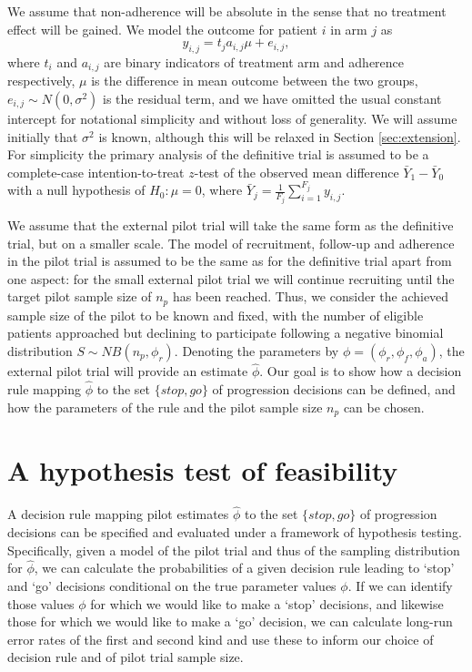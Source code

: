 \documentclass{article}
\begin{document}
We assume that non-adherence will be absolute in the sense that no treatment effect will be gained. We model the outcome for patient $i$ in arm $j$ as
$$
y_{i,j} = t_j a_{i,j} \mu + e_{i,j},
$$
where $t_i$ and $a_{i,j}$ are binary indicators of treatment arm and adherence respectively, $\mu$ is the difference in mean outcome between the two groups, $e_{i,j} \sim N(0, \sigma^2)$ is the residual term, and we have omitted the usual constant intercept for notational simplicity and without loss of generality. We will assume initially that $\sigma^2$ is known, although this will be relaxed in Section \ref{sec:extension}. For simplicity the primary analysis of the definitive trial is assumed to be a complete-case intention-to-treat $z$-test of the observed mean difference $\bar{Y}_1 - \bar{Y}_0$ with a null hypothesis of $H_0: \mu = 0$, where $\bar{Y}_j = \frac{1}{F_j} \sum_{i=1}^{F_j} y_{i,j}$.

We assume that the external pilot trial will take the same form as the definitive trial, but on a smaller scale. The model of recruitment, follow-up and adherence in the pilot trial is assumed to be the same as for the definitive trial apart from one aspect: for the small external pilot trial we will continue recruiting until the target pilot sample size of $n_p$ has been reached. Thus, we consider the achieved sample size of the pilot to be known and fixed, with the number of eligible patients approached but declining to participate following a negative binomial distribution $S \sim NB(n_p, \phi_r)$. Denoting the parameters by $\phi = (\phi_r, \phi_f, \phi_a)$, the external pilot trial will provide an estimate $\hat{\phi}$. Our goal is to show how a decision rule mapping $\hat{\phi}$ to the set $\{stop, go\}$ of progression decisions can be defined, and how the parameters of the rule and the pilot sample size $n_p$ can be chosen.

\section{A hypothesis test of feasibility}\label{sec:methods}

A decision rule mapping pilot estimates $\hat{\phi}$ to the set $\{stop, go\}$ of progression decisions can be specified and evaluated under a framework of hypothesis testing. Specifically, given a model of the pilot trial and thus of the sampling distribution for $\hat{\phi}$, we can calculate the probabilities of a given decision rule leading to `stop' and `go' decisions conditional on the true parameter values $\phi$. If we can identify those values $\phi$ for which we would like to make a `stop' decisions, and likewise those for which we would like to make a `go' decision, we can calculate long-run error rates of the first and second kind and use these to inform our choice of decision rule and of pilot trial sample size.
\end{document}
